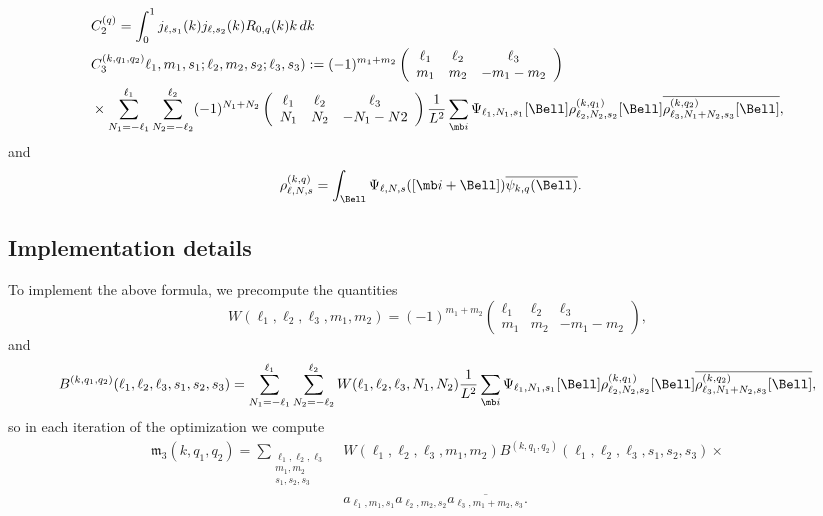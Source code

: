 \documentclass[9pt,twocolumn,twoside,lineno]{pnas-new}
\begin{document}

\begin{align*}
&C_2^{(q)} = \int_0^1j_{\ell,s_1}(k)j_{\ell,s_2}(k)R_{0,q}(k)k\, dk\\
&C_3^{(k,q_1,q_2)}\ell_1,m_1,s_1;\ell_2,m_2,s_2;\ell_3,s_3):= (-1)^{m_1+m_2}\left(\begin{array}{ccc}\ell_1 & \ell_2  & \ell_3\\ m_1 & m_2 & -m_1-m_2\end{array}\right)\\
&\times \sum_{N_1=-\ell_1}^{\ell_1}\sum_{N_2=-\ell_2}^{\ell_2}(-1)^{N_1+N_2}\left(\begin{array}{ccc}\ell_1 & \ell_2  & \ell_3\\ N_1 & N_2 & -N_1-N2\end{array}\right)\frac{1}{L^2}\sum_{\mb i}\Psi_{\ell_1,N_1,s_1}[\Bell]\rho_{\ell_2,N_2,s_2}^{(k,q_1)}[\Bell]\overline{\rho_{\ell_3,N_1+N_2,s_3}^{(k,q_2)}[\Bell]},
\end{align*}
and 
\begin{align*}
\rho_{\ell,N,s}^{(k,q)}&=\int_{\Bell}\Psi_{\ell,N,s}([\mb i+\Bell])\overline{\psi_{k,q}(\Bell)}.
\end{align*}


\subsection{Implementation details}
To implement the above formula, we precompute the quantities
\[ W(\ell_1,\ell_2,\ell_3,m_1,m_2) = (-1)^{m_1+m_2}\left(\begin{array}{ccc}\ell_1 & \ell_2  & \ell_3\\ m_1 & m_2 & -m_1-m_2\end{array}\right),\]
and
\[ B^{(k,q_1,q_2)}(\ell_1,\ell_2,\ell_3,s_1,s_2,s_3) = \sum_{N_1=-\ell_1}^{\ell_1}\sum_{N_2=-\ell_2}^{\ell_2}W(\ell_1,\ell_2,\ell_3,N_1,N_2)\frac{1}{L^2}\sum_{\mb i}\Psi_{\ell_1,N_1,s_1}[\Bell]\rho_{\ell_2,N_2,s_2}^{(k,q_1)}[\Bell]\overline{\rho_{\ell_3,N_1+N_2,s_3}^{(k,q_2)}[\Bell]},\]
so in each iteration of the optimization we compute
\[\begin{aligned} \mathfrak{m}_3(k,q_1,q_2) = \sum_{\substack{\ell_1,\ell_2,\ell_3\\m_1,m_2\\s_1,s_2,s_3}}& W(\ell_1,\ell_2,\ell_3,m_1,m_2)B^{(k,q_1,q_2)}(\ell_1,\ell_2,\ell_3,s_1,s_2,s_3)\times\\ &a_{\ell_1,m_1,s_1}a_{\ell_2,m_2,s_2}\overline{a_{\ell_3,m_1+m_2,s_3}} .\end{aligned}\]
\end{document}
